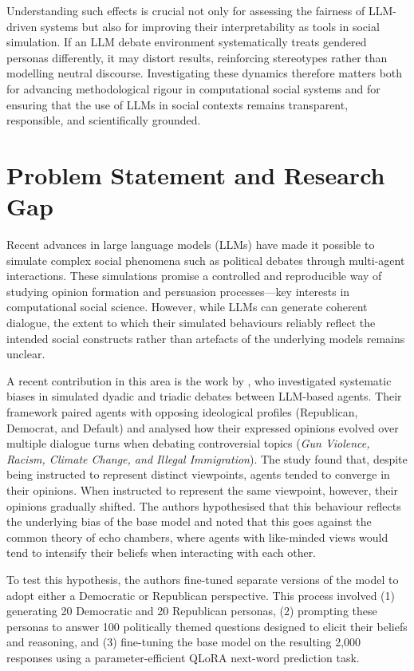 Understanding such effects is crucial not only for assessing the fairness of LLM-driven systems but also for improving their interpretability as tools in social simulation. If an LLM debate environment systematically treats gendered personas differently, it may distort results, reinforcing stereotypes rather than modelling neutral discourse. Investigating these dynamics therefore matters both for advancing methodological rigour in computational social systems and for ensuring that the use of LLMs in social contexts remains transparent, responsible, and scientifically grounded.


\section{Problem Statement and Research Gap}

Recent advances in large language models (LLMs) have made it possible to simulate complex social phenomena such as political debates through multi-agent interactions. These simulations promise a controlled and reproducible way of studying opinion formation and persuasion processes—key interests in computational social science. However, while LLMs can generate coherent dialogue, the extent to which their simulated behaviours reliably reflect the intended social constructs rather than artefacts of the underlying models remains unclear.

A recent contribution in this area is the work by \citet{taubenfeld_systematic_2024}, who investigated systematic biases in simulated dyadic and triadic debates between LLM-based agents. Their framework paired agents with opposing ideological profiles (Republican, Democrat, and Default) and analysed how their expressed opinions evolved over multiple dialogue turns when debating controversial topics (\textit{Gun Violence, Racism, Climate Change, and Illegal Immigration}). The study found that, despite being instructed to represent distinct viewpoints, agents tended to converge in their opinions. When instructed to represent the same viewpoint, however, their opinions gradually shifted. The authors hypothesised that this behaviour reflects the underlying bias of the base model and noted that this goes against the common theory of echo chambers, where agents with like-minded views would tend to intensify their beliefs when interacting with each other.

To test this hypothesis, the authors fine-tuned separate versions of the model to adopt either a Democratic or Republican perspective. This process involved (1) generating 20 Democratic and 20 Republican personas, (2) prompting these personas to answer 100 politically themed questions designed to elicit their beliefs and reasoning, and (3) fine-tuning the base model on the resulting 2,000 responses using a parameter-efficient QLoRA next-word prediction task.

